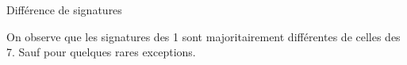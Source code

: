 \documentclass[10pt,handout]{beamer}
\begin{document}
\begin{frame}{Différence de signatures}
    \begin{block}{}
        On observe que les signatures des 1 sont majoritairement différentes de celles des 7. Sauf pour quelques rares exceptions.
    \end{block}


\end{frame}
\end{document}
